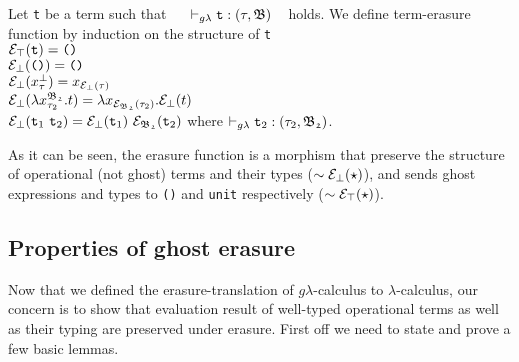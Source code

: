 \begin{dfn} 
\label{term-erasure}
Let \texttt{t} be a term such that 
~~ $\vdash_{g\lambda} \texttt{t} : (\tau, \mathfrak{B})$ ~ holds. 
We define term-erasure function by induction on 
the structure of \texttt{t}\\[0.1cm]
$ \mathcal{E}_{\top}(\texttt{t}) = \texttt{()}$\\[0.05cm]
$\mathcal{E}_{\bot}(\texttt{()}) = \texttt{()}$\\[0.05cm]
$\mathcal{E}_{\bot}(x_{\tau}^{\bot}) = x_{\mathcal{E}_{\bot}(\tau)}$\\[0.05cm]  
$\mathcal{E}_{\bot}(\lambda x_{\tau_{2}}^{\mathfrak{B_{2}}}.t) 
= \lambda x_{\mathcal{E}_{\mathfrak{B_{2}}}(\tau_{2})}. \mathcal{E}_{\bot}(t)$\\[0.05cm]  
$\mathcal{E}_{\bot}(\texttt{t}_{1} ~ \texttt{t}_{2}) 
= \mathcal{E}_{\bot}(\texttt{t}_{1})  ~ \mathcal{E}_{\mathfrak{B_{2}}}(\texttt{t}_{2})$
\quad where $ \vdash_{g\lambda} \texttt{t}_{2} : (\tau_{2}, \mathfrak{B_{2}})$.
\end{dfn}
As it can be seen, the erasure function is a morphism that preserve
the structure of operational (not ghost) terms and their types ($\sim\mathcal{E}_{\bot}(\star)$), and sends ghost expressions and types to \texttt{()} and \texttt{unit} respectively ($\sim\mathcal{E}_{\top}(\star)$).




\subsection{Properties of ghost erasure}

\quad Now that we defined the erasure-translation of $g\lambda$-calculus to $\lambda$-calculus, our concern is to show that evaluation result of well-typed operational terms as well as their typing  are preserved under erasure. 
First off we need to state and prove a few basic lemmas. 







